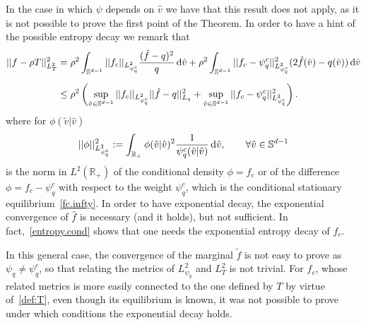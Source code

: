 \documentclass[a4paper]{article}
\theoremstyle{Theorem}\newtheorem{proposition}{Proposition}[section]
\theoremstyle{Remark}\newtheorem{remark}{Remark}[section]
\theoremstyle{Theorem}\newtheorem{theorem}{Theorem}[section]
\DeclarePairedDelimiter\ave{\langle}{\rangle}
\newcommand{\R}{\mathbb{R}}
\newcommand{\hv}{\hat{v}}
\newcommand{\tv}{\tilde{v}}
\newcommand{\hf}{\hat{f}}
\newcommand{\tf}{\tilde{f}}
\newcommand{\intS}{\int_{\mathbb{S}^{d-1}}}
\newcommand{\intR}{\int_{\R_+}}
\begin{document}
In the case in which $\psi$ depends on $\hv$ we have that this result does not apply, as it is not possible to prove the first point of the Theorem. In order to have a hint of the possible entropy decay we remark that
\begin{equation}\label{entropy.cond}
\begin{split}
    || f-\rho T||^2_{L^2_T} &= \rho^2\intS ||f_c ||_{L^2_{\psi_q^c}} \dfrac{(\hf-q)^2}{q} \, {\rm d}\hv + \rho^2 \intS ||f_c-\psi_q^c||^2_{L^2_{\psi_q^c}} (2\hf(\hv)-q(\hv)) \, {\rm d} \hv\\[0.2cm]
    &\le \rho^2 \left(\sup_{\hv \in \mathbb{S}^{d-1}}||f_c||_{L^2_{\psi_q^c}}  ||\hf-q||^2_{L_q} + \sup_{\hv \in \mathbb{S}^{d-1}} ||f_c-\psi_q^c ||^2_{L^2_{\psi_q^c}} \right). 
    \end{split}
\end{equation}
where for $\phi(\tv|\hv)$
\[
||\phi||^2_{L^2_{\psi_q^c}}  := \intR \phi(\tv|\hv)^2\dfrac{1}{\psi_q^c(\tv|\hv)} \, {\rm d} \tv, \qquad \forall \hv \in \mathbb{S}^{d-1}
\]
is the norm in $L^2(\R_+)$ of the conditional density $\phi= f_c$ or of the difference $\phi=f_c-\psi_q^c$ with respect to the weight $\psi_q^c$, which is the conditional stationary equilibrium~\eqref{fc.infty}. 
In order to have exponential decay, the exponential convergence of $\hf$ is necessary (and it holds), but not sufficient. In fact,~\eqref{entropy.cond} shows that one needs the exponential entropy decay of $f_c$. 

In this general case, the convergence of the marginal $\tf$ is not easy to prove as $\psi_q\neq \psi_q^c$, so that relating the metrics of $L^2_{\psi_q}$ and $L^2_T$ is not trivial. For $f_c$, whose related metrics is more easily connected to the one defined by $T$ by virtue of~\eqref{def:T}, even though its equilibrium is known, it was not possible to prove under which conditions the exponential decay holds.


\end{document}
